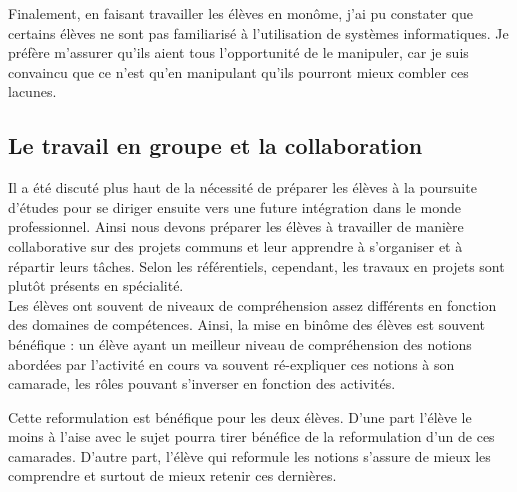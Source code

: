 \documentclass[pdftex,a4paper,12pt]{article}
\begin{document}
	Finalement, en faisant travailler les élèves en monôme, j'ai pu constater que certains élèves ne sont pas familiarisé à l'utilisation de systèmes informatiques.
	Je préfère m'assurer qu'ils aient tous l'opportunité de le manipuler, car je suis convaincu que ce n'est qu'en manipulant qu'ils pourront mieux combler ces lacunes.

	\subsection{Le travail en groupe et la collaboration}
	Il a été discuté plus haut de la nécessité de préparer les élèves à la poursuite d'études 
	pour se diriger ensuite vers une future intégration dans le monde professionnel.
	Ainsi nous devons préparer les élèves à travailler de manière collaborative sur des projets communs et leur apprendre à s'organiser et à répartir leurs tâches.
	Selon les référentiels, cependant, les travaux en projets sont plutôt présents en spécialité.\\

	Les élèves ont souvent de niveaux de compréhension assez différents en fonction des domaines de compétences.
	Ainsi, la mise en binôme des élèves est souvent bénéfique : 
	un élève ayant un meilleur niveau de compréhension des notions abordées par l'activité en cours va souvent ré-expliquer ces notions à son camarade,
	les rôles pouvant s'inverser en fonction des activités.

	Cette reformulation est bénéfique pour les deux élèves.
	D'une part l'élève le moins à l'aise avec le sujet pourra tirer bénéfice de la reformulation d'un de ces camarades.
	D'autre part, l'élève qui reformule les notions s'assure de mieux les comprendre et surtout de mieux retenir ces dernières.
\end{document}

